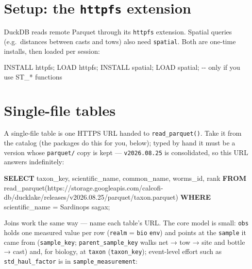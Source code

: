 \documentclass[
  letterpaper,
  DIV=11,
  numbers=noendperiod]{scrreprt}
\newenvironment{Shaded}{\begin{snugshade}}{\end{snugshade}}
\newcommand{\CommentTok}[1]{\textcolor[rgb]{0.37,0.37,0.37}{#1}}
\newcommand{\FunctionTok}[1]{\textcolor[rgb]{0.28,0.35,0.67}{#1}}
\newcommand{\KeywordTok}[1]{\textcolor[rgb]{0.00,0.23,0.31}{\textbf{#1}}}
\newcommand{\NormalTok}[1]{\textcolor[rgb]{0.00,0.23,0.31}{#1}}
\newcommand{\OperatorTok}[1]{\textcolor[rgb]{0.37,0.37,0.37}{#1}}
\newcommand{\StringTok}[1]{\textcolor[rgb]{0.13,0.47,0.30}{#1}}
\begin{document}
\section{\texorpdfstring{Setup: the \texttt{httpfs}
extension}{Setup: the httpfs extension}}\label{setup-the-httpfs-extension}

DuckDB reads remote Parquet through its \texttt{httpfs} extension.
Spatial queries (e.g.~distances between casts and tows) also need
\texttt{spatial}. Both are one-time installs, then loaded per session:

\begin{Shaded}
\begin{Highlighting}[]
\NormalTok{INSTALL httpfs; LOAD httpfs;}
\NormalTok{INSTALL spatial; LOAD spatial;   }\CommentTok{{-}{-} only if you use ST\_* functions}
\end{Highlighting}
\end{Shaded}

\section{Single-file tables}\label{single-file-tables}

A single-file table is one HTTPS URL handed to \texttt{read\_parquet()}.
Take it from the catalog (the packages do this for you, below); typed by
hand it must be a version whose \texttt{parquet/} copy is kept ---
\texttt{v2026.08.25} is consolidated, so this URL answers indefinitely:

\begin{Shaded}
\begin{Highlighting}[]
\KeywordTok{SELECT}\NormalTok{ taxon\_key, scientific\_name, common\_name, worms\_id, }\FunctionTok{rank}
\KeywordTok{FROM}\NormalTok{ read\_parquet(}\StringTok{\textquotesingle{}https://storage.googleapis.com/calcofi{-}db/ducklake/releases/v2026.08.25/parquet/taxon.parquet\textquotesingle{}}\NormalTok{)}
\KeywordTok{WHERE}\NormalTok{ scientific\_name }\OperatorTok{=} \StringTok{\textquotesingle{}Sardinops sagax\textquotesingle{}}\NormalTok{;}
\end{Highlighting}
\end{Shaded}

Joins work the same way --- name each table's URL. The core model is
small: \texttt{obs} holds one measured value per row (\texttt{realm} =
\texttt{bio} \textbar{} \texttt{env}) and points at the \texttt{sample}
it came from (\texttt{sample\_key}; \texttt{parent\_sample\_key} walks
net → tow → site and bottle → cast) and, for biology, at \texttt{taxon}
(\texttt{taxon\_key}); event-level effort such as
\texttt{std\_haul\_factor} is in \texttt{sample\_measurement}:
\end{document}
